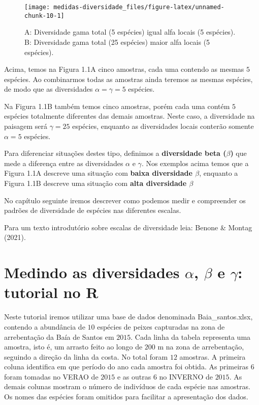 \documentclass[
]{book}
\begin{document}
\begin{figure}

{\centering \texttt{[image: medidas-diversidade\_files/figure-latex/unnamed-chunk-10-1]} 

}

\caption{A: Diversidade gama total (5 espécies) igual alfa locais (5 espécies). B: Diversidade gama total (25 espécies) maior alfa locais (5 espécies).}\label{fig:unnamed-chunk-10}
\end{figure}

Acima, temos na Figura 1.1A cinco amostras, cada uma contendo as mesmas \(5\) espécies. Ao combinarmos todas as amostras ainda teremos as mesmas espécies, de modo que as diversidades \(\alpha = \gamma = 5\) espécies.

Na Figura 1.1B também temos cinco amostras, porém cada uma contém \(5\) espécies totalmente diferentes das demais amostras. Neste caso, a diversidade na paisagem será \(\gamma = 25\) espécies, enquanto as diversidades locais conterão somente \(\alpha = 5\) espécies.

Para diferenciar situações destes tipo, definimos a \textbf{diversidade beta (\(\beta\))} que mede a diferença entre as diversidades \(\alpha\) e \(\gamma\). Nos exemplos acima temos que a Figura 1.1A descreve uma situação com \textbf{baixa diversidade \(\beta\)}, enquanto a Figura 1.1B descreve uma situação com \textbf{alta diversidade \(\beta\)}

No capítulo seguinte iremos descrever como podemos medir e compreender os padrões de diversidade de espécies nas diferentes escalas.

Para um texto introdutório sobre escalas de diversidade leia: Benone \& Montag (2021).

\hypertarget{diversidader}{%
\chapter{\texorpdfstring{Medindo as diversidades \(\alpha\), \(\beta\) e \(\gamma\): tutorial no R}{Medindo as diversidades \textbackslash alpha, \textbackslash beta e \textbackslash gamma: tutorial no R}}\label{diversidader}}

Neste tutorial iremos utilizar uma base de dados denominada Baia\_santos.xlsx, contendo a abundância de \(10\) espécies de peixes capturadas na zona de arrebentação da Baía de Santos em \(2015\). Cada linha da tabela representa uma amostra, isto é, um arrasto feito ao longo de \(200\) m na zona de arrebentação, seguindo a direção da linha da costa. No total foram \(12\) amostras. A primeira coluna identifica em que período do ano cada amostra foi obtida. As primeiras 6 foram tomadas no VERAO de \(2015\) e as outras 6 no INVERNO de \(2015\). As demais colunas mostram o número de indivíduos de cada espécie nas amostras. Os nomes das espécies foram omitidos para facilitar a apresentação dos dados.
\end{document}
